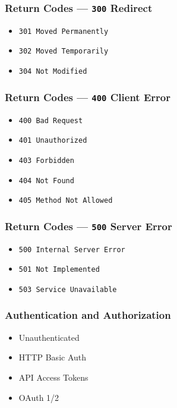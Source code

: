 \documentclass{beamer}
\begin{document}
\begin{frame}
  \frametitle{Return Codes --- \texttt{300} Redirect}
  \begin{itemize}
    \item \texttt{301 Moved Permanently}
    \item \texttt{302 Moved Temporarily}
    \item \texttt{304 Not Modified}
  \end{itemize}
\end{frame}


\begin{frame}
  \frametitle{Return Codes --- \texttt{400} Client Error}
  \begin{itemize}
    \item \texttt{400 Bad Request}
    \item \texttt{401 Unauthorized}
    \item \texttt{403 Forbidden}
    \item \texttt{404 Not Found}
    \item \texttt{405 Method Not Allowed}
  \end{itemize}
\end{frame}


\begin{frame}
  \frametitle{Return Codes --- \texttt{500} Server Error}
  \begin{itemize}
    \item \texttt{500 Internal Server Error}
    \item \texttt{501 Not Implemented}
    \item \texttt{503 Service Unavailable}
  \end{itemize}
\end{frame}


\begin{frame}
  \frametitle{Authentication and Authorization}
  \begin{itemize}
    \item Unauthenticated
    \item HTTP Basic Auth
    \item API Access Tokens
    \item OAuth 1/2
  \end{itemize}
\end{frame}
\end{document}
